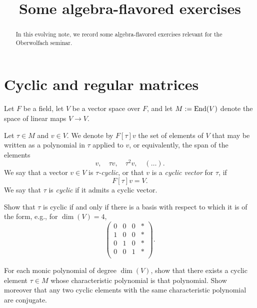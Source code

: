 \documentclass[reqno]{amsart} 
\title{Some algebra-flavored exercises}
\begin{document}
\maketitle

\begin{abstract}
  In this evolving note, we record some algebra-flavored exercises relevant for the Oberwolfach seminar.
\end{abstract}


\section{Cyclic and regular matrices}
Let $F$ be a field, let $V$ be a vector space over $F$, and let $M := \operatorname{End}(V)$ denote the space of linear maps $V \to V$.

\begin{definition}
  Let $\tau \in M$ and $v \in V$.  We denote by $F[\tau] v$ the set of elements of $V$ that may be written as a polynomial in $\tau$ applied to $v$, or equivalently, the span of the elements
  \begin{equation*}
v, \quad \tau v, \quad \tau^2 v, \quad (\dotsc).
\end{equation*}
We say that a vector $v \in V$ is $\tau$\emph{-cyclic}, or that $v$ is a \emph{cyclic vector} for $\tau$, if
\begin{equation*}
F[\tau] v = V.
\end{equation*}
We say that $\tau$ is \emph{cyclic} if it admits a cyclic vector.
\end{definition}

\begin{exercise}
  Show that $\tau$ is cyclic if and only if there is a basis with respect to which it is of the form, e.g., for $\dim(V) = 4$,
  \begin{equation*}
\begin{pmatrix}
0 & 0 & 0 & \ast \\
1 & 0 & 0 & \ast \\
0 & 1 & 0 & \ast \\
0 & 0 & 1 & \ast \\
\end{pmatrix}.
\end{equation*}
\end{exercise}

\begin{exercise}
  For each monic polynomial of degree $\dim(V)$, show that there exists a cyclic element $\tau \in M$ whose characteristic polynomial is that polynomial.  Show moreover that any two cyclic elements with the same characteristic polynomial are conjugate.
\end{exercise}
\end{document}

